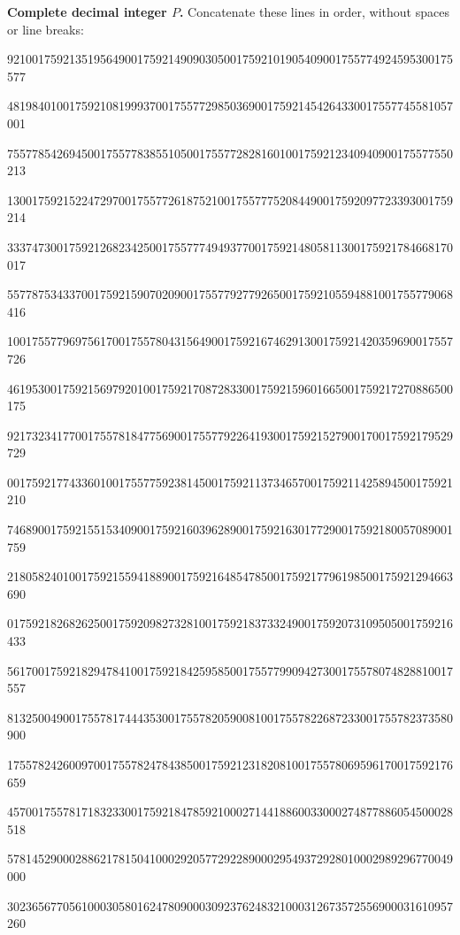 \documentclass[10pt]{article}
\begin{document}
\bigskip\textbf{Complete decimal integer $P$.} Concatenate these lines in order, without spaces or line breaks:
\par\begingroup\fontsize{6}{7}\selectfont{}\par
921001759213519564900175921490903050017592101905409001755774924595300175577\par
481984010017592108199937001755772985036900175921454264330017557745581057001\par
755778542694500175577838551050017557728281601001759212340940900175577550213\par
130017592152247297001755772618752100175577752084490017592097723393001759214\par
333747300175921268234250017557774949377001759214805811300175921784668170017\par
557787534337001759215907020900175577927792650017592105594881001755779068416\par
100175577969756170017557804315649001759216746291300175921420359690017557726\par
461953001759215697920100175921708728330017592159601665001759217270886500175\par
921732341770017557818477569001755779226419300175921527900170017592179529729\par
001759217743360100175577592381450017592113734657001759211425894500175921210\par
746890017592155153409001759216039628900175921630177290017592180057089001759\par
218058240100175921559418890017592164854785001759217796198500175921294663690\par
017592182682625001759209827328100175921837332490017592073109505001759216433\par
561700175921829478410017592184259585001755779909427300175578074828810017557\par
813250049001755781744435300175578205900810017557822687233001755782373580900\par
175578242600970017557824784385001759212318208100175578069596170017592176659\par
457001755781718323300175921847859210002714418860033000274877886054500028518\par
578145290002886217815041000292057729228900029549372928010002989296770049000\par
302365677056100030580162478090003092376248321000312673572556900031610957260\par
\end{document}
